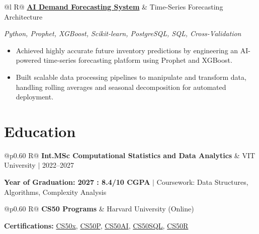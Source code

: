 \documentclass[a4paper,10pt]{article}
\newcommand{\ulink}[2]{\href{#1}{#2}}
\newcommand{\subheading}[1]{{\color[HTML]{0A0A0A}\fontsize{12}{14}\selectfont\bfseries #1}}
\newcommand{\techstack}[1]{{\color[HTML]{5C5C5C}\fontsize{10.5}{12.5}\selectfont\itshape #1}}
\newcommand{\meta}[1]{{\color[HTML]{5C5C5C}\fontsize{10.5}{12.5}\selectfont #1}}
\begin{document}
\begin{tabularx}{\linewidth}{@{}l R@{}}
\subheading{\ulink{https://github.com/su-jin1425/Demand-Forecasting-System}{AI Demand Forecasting System}} & \meta{Time-Series Forecasting Architecture}
\end{tabularx}
\techstack{Python, Prophet, XGBoost, Scikit-learn, PostgreSQL, SQL, Cross-Validation}
\begin{itemize}[nosep, leftmargin=1.5em, itemsep=2pt, topsep=2pt]
  \item {\color[HTML]{0A0A0A}\fontsize{11}{14}\selectfont Achieved highly accurate future inventory predictions by engineering an AI-powered time-series forecasting platform using Prophet and XGBoost.}
  \item {\color[HTML]{0A0A0A}\fontsize{11}{14}\selectfont Built scalable data processing pipelines to manipulate and transform data, handling rolling averages and seasonal decomposition for automated deployment.}
\end{itemize}

\section{Education}
\vspace{2pt}

\begin{tabularx}{\linewidth}{@{}p{0.60\linewidth} R@{}}
\subheading{Int.MSc Computational Statistics and Data Analytics} & \meta{VIT University $|$ 2022--2027}
\end{tabularx}
{\color[HTML]{3A3A3A}\fontsize{11}{14}\selectfont \textbf{Year of Graduation: 2027 : 8.4/10 CGPA} $|$ Coursework: Data Structures, Algorithms, Complexity Analysis}

\begin{tabularx}{\linewidth}{@{}p{0.60\linewidth} R@{}}
\subheading{CS50 Programs} & \meta{Harvard University (Online)}
\end{tabularx}
{\color[HTML]{3A3A3A}\fontsize{11}{14}\selectfont \textbf{Certifications:} \ulink{https://cs50.harvard.edu/certificates/b14b78df-e05c-413e-a607-1dd27303053a}{CS50x}, \ulink{https://cs50.harvard.edu/certificates/32477052-9db4-49c4-a5a4-d7e58429ca2c}{CS50P}, \ulink{https://cs50.harvard.edu/certificates/9cdb4d4a-1250-4f8e-9fd7-191864e0f919}{CS50AI}, \ulink{https://cs50.harvard.edu/certificates/bc486f24-f085-4e61-8536-80940b97a1b9}{CS50SQL}, \ulink{https://cs50.harvard.edu/certificates/666838e6-a053-4d82-b179-a60fe745fd84}{CS50R}}
\end{document}
